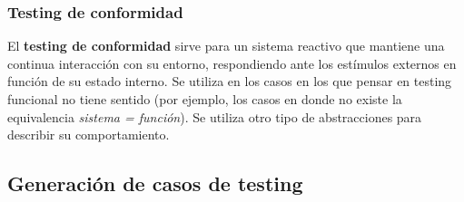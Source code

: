 \documentclass[]{article}
\begin{document}
\subsubsection{Testing de conformidad}
El \textbf{testing de conformidad} sirve para un sistema reactivo que mantiene una continua interacción con su entorno, respondiendo ante los estímulos externos en función de su estado interno. Se utiliza en los casos en los que pensar en testing funcional no tiene sentido (por ejemplo, los casos en donde no existe la equivalencia \textit{sistema = función}). Se utiliza otro tipo de abstracciones para describir su comportamiento.

\subsection{Generación de casos de testing}
\end{document}
